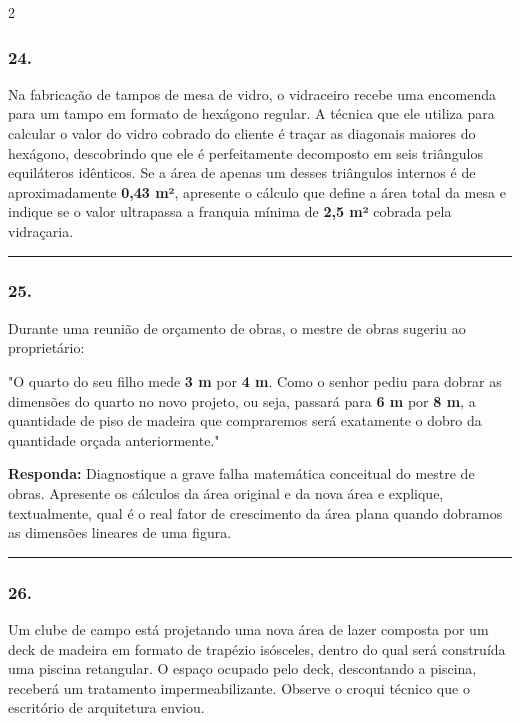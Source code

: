 \documentclass[twoside, 10pt, a4paper]{article}
\newlength{\espacoPreQuestao}\setlength{\espacoPreQuestao}{0.1cm}
\newlength{\espacoQuestao}\setlength{\espacoQuestao}{0.2cm}
\begin{document}
\begin{multicols*}{2}
\subsubsection*{24.} Na fabricação de tampos de mesa de vidro, o vidraceiro recebe uma encomenda para um tampo em formato de hexágono regular. A técnica que ele utiliza para calcular o valor do vidro cobrado do cliente é traçar as diagonais maiores do hexágono, descobrindo que ele é perfeitamente decomposto em seis triângulos equiláteros idênticos. Se a área de apenas um desses triângulos internos é de aproximadamente \textbf{0,43 m²}, apresente o cálculo que define a área total da mesa e indique se o valor ultrapassa a franquia mínima de \textbf{2,5 m²} cobrada pela vidraçaria.
\par\vspace{\espacoQuestao}

\noindent\textcolor{CorLinha}{\rule{\linewidth}{0.5pt}} 
\par\vspace{\espacoPreQuestao}
\subsubsection*{25.} Durante uma reunião de orçamento de obras, o mestre de obras sugeriu ao proprietário: 
\par
"O quarto do seu filho mede \textbf{3 m} por \textbf{4 m}. Como o senhor pediu para dobrar as dimensões do quarto no novo projeto, ou seja, passará para \textbf{6 m} por \textbf{8 m}, a quantidade de piso de madeira que compraremos será exatamente o dobro da quantidade orçada anteriormente."
\begin{boxresponda}
\textbf{Responda:} Diagnostique a grave falha matemática conceitual do mestre de obras. Apresente os cálculos da área original e da nova área e explique, textualmente, qual é o real fator de crescimento da área plana quando dobramos as dimensões lineares de uma figura.
\end{boxresponda}
\par\vspace{\espacoQuestao}

\noindent\textcolor{CorLinha}{\rule{\linewidth}{0.5pt}} 
\par\vspace{\espacoPreQuestao}
\subsubsection*{26.} Um clube de campo está projetando uma nova área de lazer composta por um deck de madeira em formato de trapézio isósceles, dentro do qual será construída uma piscina retangular. O espaço ocupado pelo deck, descontando a piscina, receberá um tratamento impermeabilizante. Observe o croqui técnico que o escritório de arquitetura enviou.


\end{multicols*}
\end{document}
